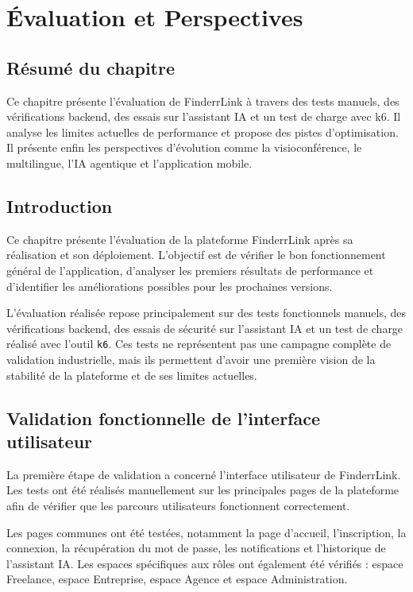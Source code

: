 \chapter{Évaluation et Perspectives}
\section*{Résumé du chapitre}

Ce chapitre présente l'évaluation de FinderrLink à travers des tests manuels, des vérifications backend, des essais sur l'assistant IA et un test de charge avec k6. Il analyse les limites actuelles de performance et propose des pistes d'optimisation. Il présente enfin les perspectives d'évolution comme la visioconférence, le multilingue, l'IA agentique et l'application mobile.

\section{Introduction}

Ce chapitre présente l'évaluation de la plateforme FinderrLink après sa réalisation et son déploiement. L'objectif est de vérifier le bon fonctionnement général de l'application, d'analyser les premiers résultats de performance et d'identifier les améliorations possibles pour les prochaines versions.

L'évaluation réalisée repose principalement sur des tests fonctionnels manuels, des vérifications backend, des essais de sécurité sur l'assistant IA et un test de charge réalisé avec l'outil \texttt{k6}. Ces tests ne représentent pas une campagne complète de validation industrielle, mais ils permettent d'avoir une première vision de la stabilité de la plateforme et de ses limites actuelles.

\section{Validation fonctionnelle de l'interface utilisateur}

La première étape de validation a concerné l'interface utilisateur de FinderrLink. Les tests ont été réalisés manuellement sur les principales pages de la plateforme afin de vérifier que les parcours utilisateurs fonctionnent correctement.

Les pages communes ont été testées, notamment la page d'accueil, l'inscription, la connexion, la récupération du mot de passe, les notifications et l'historique de l'assistant IA. Les espaces spécifiques aux rôles ont également été vérifiés : espace Freelance, espace Entreprise, espace Agence et espace Administration.

